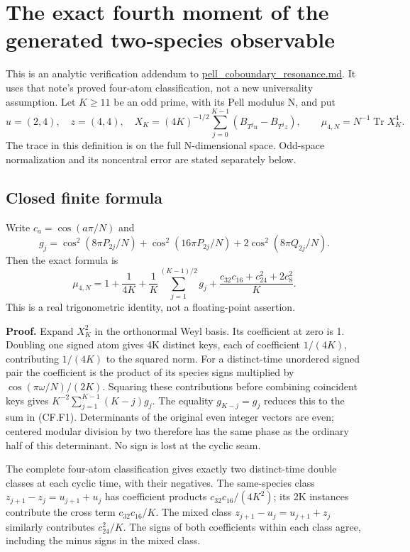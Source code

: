 \section{The exact fourth moment of the generated two-species observable}\label{sec:cobfourth}
This is an analytic verification addendum to \url{pell_coboundary_resonance.md}. It uses that note's proved four-atom classification, not a new universality assumption. Let \(K\geq11\) be an odd prime, with its Pell modulus N, and put \[
 u=(2,4),\quad z=(4,4),\quad
 X_K=(4K)^{-1/2}\sum_{j=0}^{K-1}(B_{T^ju}-B_{T^jz}),
 \qquad \mu_{4,N}=N^{-1}\operatorname{Tr}X_K^4.
\] The trace in this definition is on the full N-dimensional space. Odd-space normalization and its noncentral error are stated separately below.

\subsection{Closed finite formula}\label{cobfourth:closed-finite-formula}

Write \(c_a=\cos(a\pi/N)\) and \[
 g_j=\cos^2(8\pi P_{2j}/N)+\cos^2(16\pi P_{2j}/N)
                                  +2\cos^2(8\pi Q_{2j}/N).
\] Then the exact formula is \[
 \boxed{\displaystyle
 \mu_{4,N}=1+\frac{1}{4K}+\frac1K\sum_{j=1}^{(K-1)/2}g_j
       +\frac{c_{32}c_{16}+c_{24}^2+2c_8^2}{K}.}                \tag{CF.F1}
\] This is a real trigonometric identity, not a floating-point assertion.

\textbf{Proof.} Expand \(X_K^2\) in the orthonormal Weyl basis. Its coefficient at zero is 1. Doubling one signed atom gives 4K distinct keys, each of coefficient \(1/(4K)\), contributing \(1/(4K)\) to the squared norm. For a distinct-time unordered signed pair the coefficient is the product of its species signs multiplied by \(\cos(\pi\omega/N)/(2K)\). Squaring these contributions before combining coincident keys gives \(K^{-2}\sum_{j=1}^{K-1}(K-j)g_j\). The equality \(g_{K-j}=g_j\) reduces this to the sum in (CF.F1). Determinants of the original even integer vectors are even; centered modular division by two therefore has the same phase as the ordinary half of this determinant. No sign is lost at the cyclic seam.

The complete four-atom classification gives exactly two distinct-time double classes at each cyclic time, with their negatives. The same-species class \(z_{j+1}-z_j=u_{j+1}+u_j\) has coefficient products \(c_{32}c_{16}/(4K^2)\); its 2K instances contribute the cross term \(c_{32}c_{16}/K\). The mixed class \(z_{j+1}-u_j=u_{j+1}+z_j\) similarly contributes \(c_{24}^2/K\). The signs of both coefficients within each class agree, including the minus signs in the mixed class.

